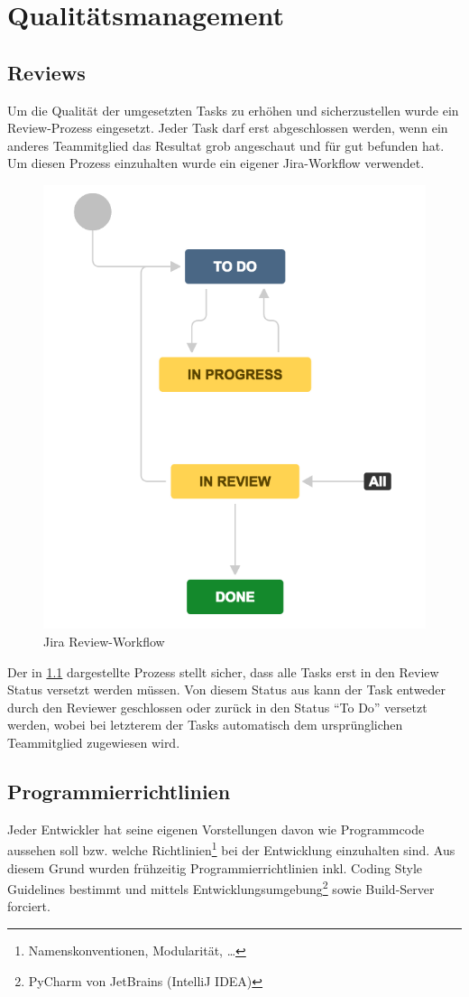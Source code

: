 \chapter{Qualitätsmanagement}

\section{Reviews}

Um die Qualität der umgesetzten Tasks zu erhöhen und sicherzustellen wurde ein Review-Prozess eingesetzt. Jeder Task darf erst abgeschlossen werden, wenn ein anderes Teammitglied das Resultat grob angeschaut und für gut befunden hat. Um diesen Prozess einzuhalten wurde ein eigener Jira-Workflow verwendet.

\begin{figure}
\centering
\includegraphics[width=0.7\linewidth]{fig/jira-workflow}
\caption{Jira Review-Workflow}
\label{fig:jira-workflow}
\end{figure}

Der in \cref{fig:jira-workflow} dargestellte Prozess stellt sicher, dass alle Tasks erst in den Review Status versetzt werden müssen. Von diesem Status aus kann der Task entweder durch den Reviewer geschlossen oder zurück in den Status ``To Do'' versetzt werden, wobei bei letzterem der Tasks automatisch dem ursprünglichen Teammitglied zugewiesen wird.


\section{Programmierrichtlinien}
Jeder Entwickler hat seine eigenen Vorstellungen davon wie Programmcode aussehen soll bzw. welche Richtlinien\footnote{Namenskonventionen, Modularität, \dots} bei der Entwicklung einzuhalten sind. Aus diesem Grund wurden frühzeitig Programmierrichtlinien inkl. Coding Style Guidelines bestimmt und mittels Entwicklungsumgebung\footnote{PyCharm von JetBrains (IntelliJ IDEA)} sowie Build-Server forciert.


